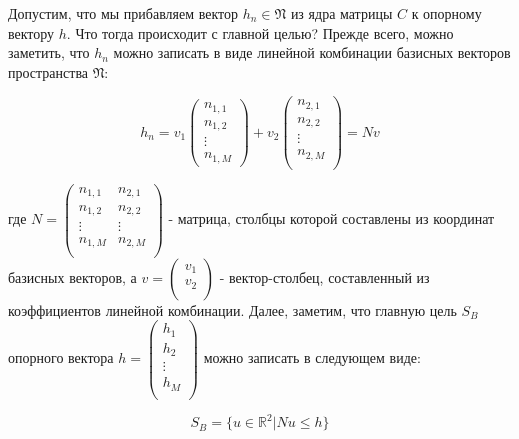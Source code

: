 \documentclass[a4paper, 12pt, titlepage]{article}
\theoremstyle{definition}
\theoremstyle{plain}
\begin{document}
Допустим, что мы прибавляем вектор $h_{n} \in \mathfrak{N}$ из ядра матрицы $C$
к опорному вектору $h$. Что тогда происходит с главной целью? Прежде всего,
можно заметить, что $h_{n}$ можно записать в виде линейной комбинации базисных
векторов пространства $\mathfrak{N}$:

\begin{equation}
h_{n} = v_{1} \left(
  \begin{array}{c}
   n_{1, 1} \\
   n_{1, 2} \\
   \vdots \\
   n_{1, M}
  \end{array}
  \right) + v_{2} \left(
  \begin{array}{c}
   n_{2, 1} \\
   n_{2, 2} \\
   \vdots \\
   n_{2, M} \\
  \end{array}
  \right) = N v
\end{equation}

где $N = \left(
     \begin{array}{cc}
      n_{1, 1} & n_{2, 1} \\
      n_{1, 2} & n_{2, 2} \\
      \vdots & \vdots \\
      n_{1, M} & n_{2, M} \\
     \end{array}
     \right)$ - матрица, столбцы которой составлены из координат базисных
векторов, а
$v = \left(
     \begin{array}{c}
      v_{1} \\
      v_{2} \\
     \end{array}
     \right)$ - вектор-столбец, составленный из коэффициентов линейной
комбинации. Далее, заметим, что главную цель $S_{B}$ опорного вектора
$h = \left(
  \begin{array}{c}
   h_{1} \\
   h_{2} \\
   \vdots \\
   h_{M} \\
  \end{array}
  \right)$ можно записать в следующем виде:

\begin{equation}
S_{B} = \{u \in \mathbb{R}^{2} | N u \leq h\}
\end{equation}
\end{document}
